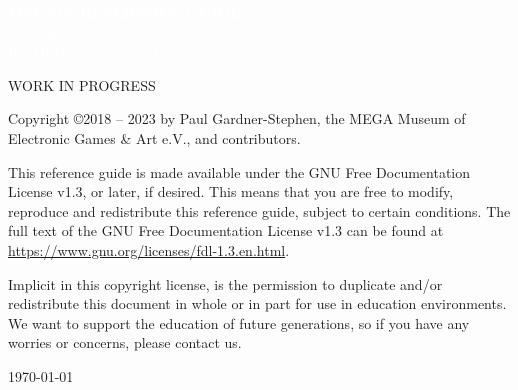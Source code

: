 





%

\cleardoublepage


  \begin{titlepage}
    \pagecolor{blue}
     \begin{center}
       {
         \large
         \vspace*{2cm}
               {\Huge\textcolor{white}{\bf{MEGA65 REFERENCE GUIDE}}}\\
             \vspace{\fill}
                    {\textcolor{white}{Published by \\ the MEGA Museum of Electronic Games \& Art e.V., Germany.}}
       }
     \end{center}
   \end{titlepage}

  \pagecolor{white}\textcolor{black}
  \vfill
  WORK IN PROGRESS

  Copyright \copyright 2018 -- 2023 by Paul Gardner-Stephen, the MEGA Museum of Electronic Games \& Art e.V., and contributors.

  This reference guide is made available under the GNU Free Documentation License v1.3, or later, if desired. This means that you are free to modify, reproduce
  and redistribute this reference guide, subject to certain conditions. The full text of the GNU Free Documentation License v1.3 can be
  found at \url{https://www.gnu.org/licenses/fdl-1.3.en.html}.

  Implicit in this copyright license, is the permission to duplicate and/or redistribute this document in whole or in part for use in
  education environments.  We want to support the education of future generations, so if you have any worries or concerns, please
  contact us.

   \par\today

